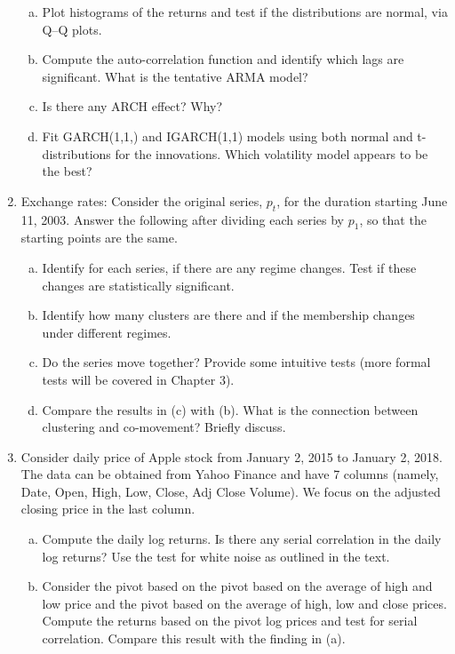 \begin{enumerate}[1.]
\begin{enumerate}[(a)]
\item Plot histograms of the returns and test if the distributions are normal, via Q--Q plots.

\item Compute the auto-correlation function and identify which lags are significant. What is the tentative ARMA model?

\item Is there any ARCH effect? Why?

\item Fit GARCH(1,1,) and IGARCH(1,1) models using both normal and t-distributions for the innovations. Which volatility model appears to be the best?
\end{enumerate}

 \item Exchange rates: Consider the original series, $p_t$, for the duration starting June 11, 2003.
 Answer the following after dividing each series by $p_1$, so that the starting points are the same.
\begin{enumerate}[(a)]
\item Identify for each series, if there are any regime changes. Test if these changes are statistically significant.

\item Identify how many clusters are there and if the membership changes under different regimes.

\item Do the series move together? Provide some intuitive tests (more formal tests will be covered in Chapter 3). 

\item Compare the results in (c)  with (b). What is the connection between clustering and co-movement? Briefly discuss.
\end{enumerate}


\item Consider daily price of Apple stock from January 2, 2015 to January 2, 2018. The data can be obtained from Yahoo Finance and have 7 columns (namely, Date, Open, High, Low, Close, Adj Close Volume). We focus on the adjusted closing price in the last column.
\begin{enumerate}[(a)]
\item Compute the daily log returns. Is there any serial correlation in the daily log returns? Use the test for white noise as outlined in the text. 

\item Consider the pivot based on the pivot based on the average of high and low price and the pivot based on the average of high, low and close prices. Compute the returns based on the pivot log prices and test for serial correlation. Compare this result with the finding in (a). 


\end{enumerate}
\end{enumerate}
